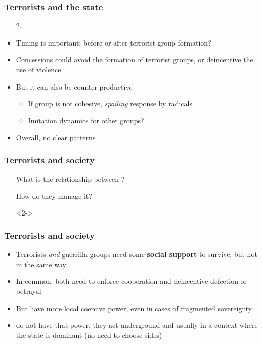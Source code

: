 \documentclass[aspectratio=43]{beamer}
\begin{document}
\begin{frame}
\frametitle{Terrorists and the state}
\centering

\begin{itemize}
  \item[2.] {\color{red}{Policy concessions}}
  \item<2-> Timing is important: before or after terrorist group formation?
  \item<3-> Concessions could avoid the formation of terrorist groups, or deincentive the use of violence
  \item<4-> But it can also be counter-productive
  \begin{itemize}
    \item If group is not cohesive, \textit{spoiling} response by radicals
    \item Imitation dynamics for other groups?
  \end{itemize}
  \item<5-> Overall, no clear patterns
\end{itemize}

\end{frame}

\begin{frame}
\frametitle{Terrorists and society}
\centering

\begin{itemize}[<+->]
  \item[] What is the relationship between {\color{red}{terrorists and civilians}}?
  \item[] How do they manage it?
  \item[]<2-> {\color{white}{And how are they influenced by it?}}
\end{itemize}

\end{frame}

\begin{frame}
\frametitle{Terrorists and society}
\centering

\begin{itemize}[<+->]
  \item Terrorists \textit{and} guerrilla groups need some \textbf{social support} to survive, but not in the same way
  \item In common: both need to enforce cooperation and deincentive defection or betrayal
  \item But {\color{red}{guerrillas}} have more local coercive power, even in cases of fragmented sovereignty
  \item {\color{red}{Terrorists}} do not have that power, they act underground and usually in a context where the state is dominant (no need to choose sides)
\end{itemize}

\end{frame}
\end{document}
